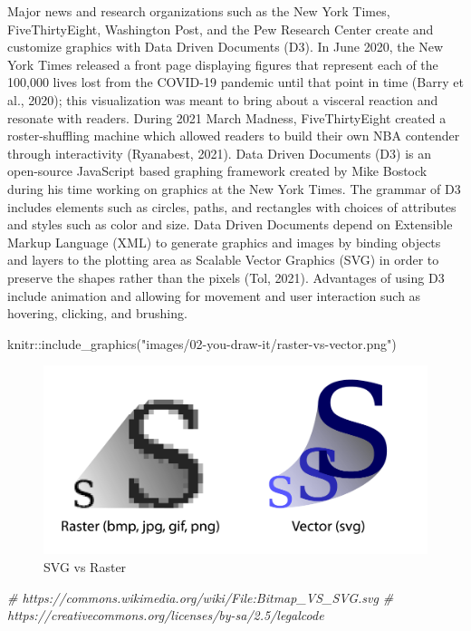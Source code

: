 \documentclass[print]{nuthesis}
\newenvironment{Shaded}{\begin{snugshade}}{\end{snugshade}}
\newcommand{\CommentTok}[1]{\textcolor[rgb]{0.56,0.35,0.01}{\textit{#1}}}
\newcommand{\FunctionTok}[1]{\textcolor[rgb]{0.00,0.00,0.00}{#1}}
\newcommand{\NormalTok}[1]{#1}
\newcommand{\SpecialCharTok}[1]{\textcolor[rgb]{0.00,0.00,0.00}{#1}}
\newcommand{\StringTok}[1]{\textcolor[rgb]{0.31,0.60,0.02}{#1}}
\begin{document}
Major news and research organizations such as the New York Times, FiveThirtyEight, Washington Post, and the Pew Research Center create and customize graphics with Data Driven Documents (D3).
In June 2020, the New York Times released a front page displaying figures that represent each of the 100,000 lives lost from the COVID-19 pandemic until that point in time (Barry et al., 2020); this visualization was meant to bring about a visceral reaction and resonate with readers.
During 2021 March Madness, FiveThirtyEight created a roster-shuffling machine which allowed readers to build their own NBA contender through interactivity (Ryanabest, 2021).
Data Driven Documents (D3) is an open-source JavaScript based graphing framework created by Mike Bostock during his time working on graphics at the New York Times.
The grammar of D3 includes elements such as circles, paths, and rectangles with choices of attributes and styles such as color and size.
Data Driven Documents depend on Extensible Markup Language (XML) to generate graphics and images by binding objects and layers to the plotting area as Scalable Vector Graphics (SVG) in order to preserve the shapes rather than the pixels  (Tol, 2021).
Advantages of using D3 include animation and allowing for movement and user interaction such as hovering, clicking, and brushing.

\begin{Shaded}
\begin{Highlighting}[]
\NormalTok{knitr}\SpecialCharTok{::}\FunctionTok{include\_graphics}\NormalTok{(}\StringTok{"images/02{-}you{-}draw{-}it/raster{-}vs{-}vector.png"}\NormalTok{)}
\end{Highlighting}
\end{Shaded}

\begin{figure}
\includegraphics[width=0.7\linewidth]{images/02-you-draw-it/raster-vs-vector} \caption{SVG vs Raster}\label{fig:raster-vs-vector}
\end{figure}

\begin{Shaded}
\begin{Highlighting}[]
\CommentTok{\# https://commons.wikimedia.org/wiki/File:Bitmap\_VS\_SVG.svg}
\CommentTok{\# https://creativecommons.org/licenses/by{-}sa/2.5/legalcode}
\end{Highlighting}
\end{Shaded}
\end{document}
